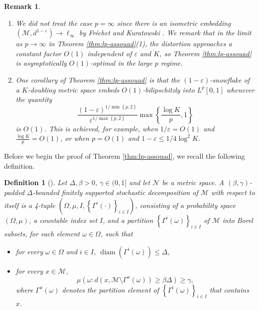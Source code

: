 \documentclass[11pt,reqno]{amsart}
\newtheorem{remark}[theorem]{Remark}
\newtheorem{definition}[theorem]{Definition}
\newcommand{\1}{\mathbf 1}
\begin{document}
\begin{remark}\,
\begin{enumerate}
    \item We did not treat the case $p=\infty$ since there is an isometric embedding $\left(\mathcal{M},d^{1-\varepsilon}\right)\to \ell_\infty$ by Fr\'echet \cite{frechet1906quelques} and Kuratowski \cite{kuratowski1935quelques}. We remark that in the limit as $p\to\infty$ in Theorem \ref{thm:lp-assouad}(1), the distortion approaches a constant factor $O\left(1\right)$ independent of $\varepsilon$ and $K$, so Theorem \ref{thm:lp-assouad} is asymptotically $O(1)$-optimal in the large $p$ regime.
    \item One corollary of Theorem \ref{thm:lp-assouad} is that the $(1-\varepsilon)$-snowflake of a $K$-doubling metric space embeds $O(1)$-bilipschitzly into $L^p[0,1]$ whenever the quantity
    \[
    \frac{(1-\varepsilon)^{1/\min\left\{p,2\right\}}}{\varepsilon^{1/\max\left\{p,2\right\}}}\max\left\{\frac{\log K}{p},1\right\}
    \]
    is $O(1)$. This is achieved, for example, when $1/\varepsilon=O(1)$ and $\frac{\log K}{p}=O(1)$, or when $p=O(1)$ and $1-\varepsilon\le 1/4\log^2K$.
\end{enumerate}
        
\end{remark}

Before we begin the proof of Theorem \ref{thm:lp-assouad}, we recall the following definition.
\begin{definition}[{\cite[Definition 3.2, 3.3]{lee2005extending}}]
    Let $\Delta,\beta>0$, $\gamma\in (0,1]$ and let $\mathcal{N}$ be a metric space. A $\left(\beta,\gamma\right)$-padded $\Delta$-bounded finitely supported stochastic decomposition of $\mathcal{M}$ with respect to itself is a 4-tuple $\left(\Omega,\mu,I,\left\{\Gamma^i\left(\cdot\right)\right\}_{i\in I}\right)$, consisting of a probability space $\left(\Omega,\mu\right)$, a countable index set $I$,  and a partition $\left\{\Gamma^i\left(\omega\right)\right\}_{i\in I}$ of $\mathcal{M}$ into Borel subsets, for each element $\omega\in \Omega$, such that
\begin{itemize}
    \item for every $\omega\in \Omega$ and $i\in I$, $\operatorname{diam}\left(\Gamma^i\left(\omega\right)\right)\le \Delta$,
    \item for every $x\in \mathcal{M}$,
    \begin{equation}\label{eq:padded}
    \mu\left(\omega:d\left(x,\mathcal{M}\setminus\Gamma^x\left(\omega\right)\right)\ge \beta\Delta\right)\ge \gamma,
    \end{equation}
    where $\Gamma^x\left(\omega\right)$ denotes the partition element of $\left\{\Gamma^i(\omega)\right\}_{i\in I}$ that contains $x$.
\end{itemize}
\end{definition}
\end{document}
